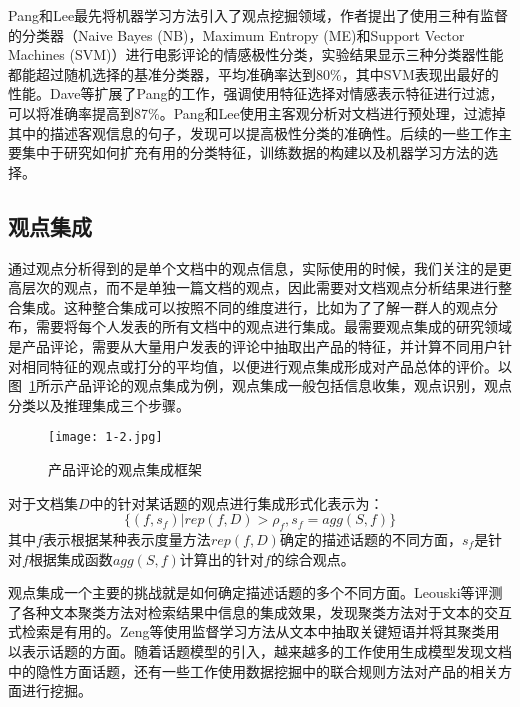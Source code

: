 Pang和Lee最先将机器学习方法引入了观点挖掘领域，作者提出了使用三种有监督的分类器（Naive Bayes (NB)，Maximum Entropy (ME)和Support Vector Machines (SVM)）进行电影评论的情感极性分类，实验结果显示三种分类器性能都能超过随机选择的基准分类器，平均准确率达到80\%，其中SVM表现出最好的性能。Dave等扩展了Pang的工作，强调使用特征选择对情感表示特征进行过滤，可以将准确率提高到87\%。Pang和Lee使用主客观分析对文档进行预处理，过滤掉其中的描述客观信息的句子，发现可以提高极性分类的准确性。后续的一些工作主要集中于研究如何扩充有用的分类特征，训练数据的构建以及机器学习方法的选择。

\subsection{观点集成}
\label{ch_integrate}
通过观点分析得到的是单个文档中的观点信息，实际使用的时候，我们关注的是更高层次的观点，而不是单独一篇文档的观点，因此需要对文档观点分析结果进行整合集成。这种整合集成可以按照不同的维度进行，比如为了了解一群人的观点分布，需要将每个人发表的所有文档中的观点进行集成。最需要观点集成的研究领域是产品评论，需要从大量用户发表的评论中抽取出产品的特征，并计算不同用户针对相同特征的观点或打分的平均值，以便进行观点集成形成对产品总体的评价。以图~\ref{fig1-2}所示产品评论的观点集成为例，观点集成一般包括信息收集，观点识别，观点分类以及推理集成三个步骤。
\begin{figure}[htp]
\centering
\texttt{[image: 1-2.jpg]}
\caption{产品评论的观点集成框架}
\label{fig1-2}
\end{figure}

对于文档集$ D $中的针对某话题的观点进行集成形式化表示为：
\begin{equation}
\{(f,s_f)|rep(f,D)>\rho_f,s_f=agg(S,f)\}
\end{equation}
其中$ f $表示根据某种表示度量方法$ rep(f,D) $确定的描述话题的不同方面，$ s_f $是针对$ f $根据集成函数$ agg(S,f) $计算出的针对$ f $的综合观点。

观点集成一个主要的挑战就是如何确定描述话题的多个不同方面。Leouski等评测了各种文本聚类方法对检索结果中信息的集成效果，发现聚类方法对于文本的交互式检索是有用的。Zeng等使用监督学习方法从文本中抽取关键短语并将其聚类用以表示话题的方面。随着话题模型的引入，越来越多的工作使用生成模型发现文档中的隐性方面话题，还有一些工作使用数据挖掘中的联合规则方法对产品的相关方面进行挖掘。

